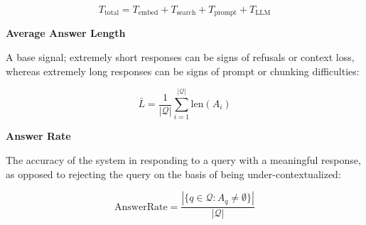 \begin{equation}
    T_{\text{total}} = T_{\text{embed}} + T_{\text{search}} + T_{\text{prompt}} + T_{\text{LLM}}
\end{equation}

\textbf{Average Answer Length}

A base signal; extremely short responses can be signs of refusals or context loss, whereas extremely long responses can be signs of prompt or chunking difficulties:

\begin{equation}
    \bar{L} = \frac{1}{|\mathcal{Q}|} \sum_{i=1}^{|\mathcal{Q}|} \text{len}(A_i)
\end{equation}

\textbf{Answer Rate}

The accuracy of the system in responding to a query with a meaningful response, as opposed to rejecting the query on the basis of being under-contextualized:

\begin{equation}
    \text{AnswerRate} = \frac{|\{q \in \mathcal{Q} : A_q \neq \emptyset\}|}{|\mathcal{Q}|}
\end{equation}
